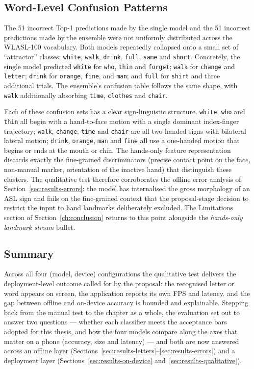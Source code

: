 \subsection{Word-Level Confusion Patterns}
\label{sec:results-qualitative-confusions}

The 51 incorrect Top-1 predictions made by the single model and the
51 incorrect predictions made by the ensemble were not uniformly
distributed across the WLASL-100 vocabulary. Both models repeatedly
collapsed onto a small set of ``attractor'' classes: \texttt{white},
\texttt{walk}, \texttt{drink}, \texttt{full}, \texttt{same} and
\texttt{short}. Concretely, the single model predicted
\texttt{white} for \texttt{who}, \texttt{thin} and \texttt{forget};
\texttt{walk} for \texttt{change} and \texttt{letter};
\texttt{drink} for \texttt{orange}, \texttt{fine}, and \texttt{man};
and \texttt{full} for \texttt{shirt} and three additional trials.
The ensemble's confusion table follows the same shape, with
\texttt{walk} additionally absorbing \texttt{time},
\texttt{clothes} and \texttt{chair}.

Each of these confusion sets has a clear sign-linguistic structure.
\texttt{white}, \texttt{who} and \texttt{thin} all begin with a
hand-to-face motion with a single dominant index-finger trajectory;
\texttt{walk}, \texttt{change}, \texttt{time} and \texttt{chair}
are all two-handed signs with bilateral lateral motion;
\texttt{drink}, \texttt{orange}, \texttt{man} and \texttt{fine}
all use a one-handed motion that begins or ends at the mouth or
chin. The hands-only feature representation discards exactly the
fine-grained discriminators (precise contact point on the face,
non-manual marker, orientation of the inactive hand) that
distinguish these clusters. The qualitative test therefore
corroborates the offline error analysis of
Section~\ref{sec:results-errors}: the model has internalised the
gross morphology of an ASL sign and fails on the fine-grained
context that the proposal-stage decision to restrict the input to
hand landmarks deliberately excluded. The Limitations section of
Section~\ref{ch:conclusion} returns to this point alongside the
\emph{hands-only landmark stream} bullet.

\subsection{Summary}
\label{sec:results-qualitative-summary}

Across all four (model, device) configurations the qualitative test
delivers the deployment-level outcome called for by the proposal:
the recognised letter or word appears on screen, the application
reports its own FPS and latency, and the gap between offline and
on-device accuracy is bounded and explainable. Stepping back from
the manual test to the chapter as a whole, the evaluation set out to
answer two questions --- whether each classifier meets the acceptance
bars adopted for this thesis, and how the four models compare along
the axes that matter on a phone (accuracy, size and latency) --- and
both are now answered across an offline layer
(Sections~\ref{sec:results-letters}--\ref{sec:results-errors}) and a
deployment layer (Sections~\ref{sec:results-on-device}
and~\ref{sec:results-qualitative}).

